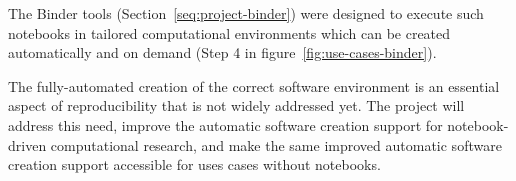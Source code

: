 The Binder tools (Section~\ref{seq:project-binder}) were designed to execute
such notebooks in tailored computational environments which can be created
automatically and on demand (Step 4 in figure~\ref{fig:use-cases-binder}).

The fully-automated creation of the correct software environment is an
essential aspect of reproducibility that is not widely addressed yet. The
\TheProject{} project will address this need, improve the automatic software creation support
for notebook-driven computational research, and make the same improved automatic
software creation support accessible for uses cases without notebooks.

